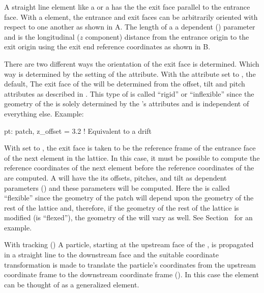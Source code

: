 {A straight line element like a  or a  has the
the exit face parallel to the entrance face. With a 
element, the entrance and exit faces can be arbitrarily oriented with
respect to one another as shown in A. The length 
of a  a dependent () parameter and is the
longitudinal ($z$ component) distance from the entrance origin to the
exit origin using the exit end reference coordinates as shown in
B.

There are two different ways the orientation of the exit face is
determined. Which way is determined by the setting of the
 attribute.  With the  attribute set to
, the default, The exit face of the  will be
determined from the offset, tilt and pitch attributes as described in
. This type of  is called ``rigid'' or
``inflexible'' since the geometry of the  is solely
determined by the 's attributes and is independent of
everything else.  Example:
\begin{example}
  pt: patch, z_offset = 3.2   ! Equivalent to a drift
\end{example}

With  set to , the exit face is taken to be the
reference frame of the entrance face of the next element in the
lattice. In this case, it must be possible to compute the reference
coordinates of the next element before the reference coordinates of
the  are computed. A   will have the
its offsets, pitches, and tilt as dependent parameters
() and these parameters will be computed. Here the
 is called ``flexible'' since the geometry of the patch will
depend upon the geometry of the rest of the lattice and, therefore, if
the geometry of the rest of the lattice is modified (is ``flexed''),
the geometry of the  will vary as well. See
Section~ for an example.

With  tracking () A particle, starting
at the upstream face of the , is propagated in a straight
line to the downstream face and the suitable coordinate transformation
is made to translate the particle's coordinates from the upstream
coordinate frame to the downstream coordinate frame
(). In this case the  element can be
thought of as a generalized  element.

}
